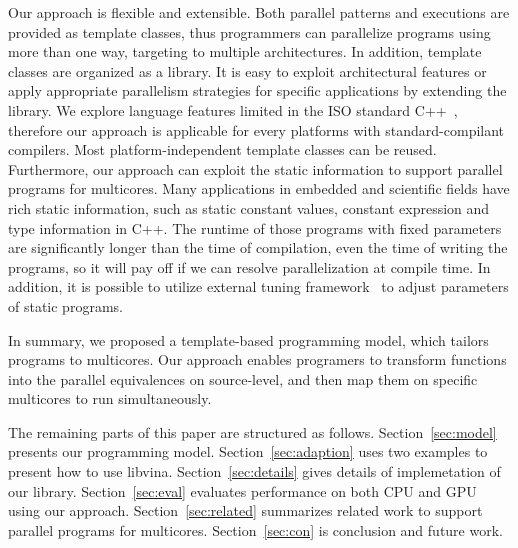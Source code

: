 Our approach is flexible and extensible. Both parallel patterns and
executions are provided as template classes, thus programmers can
parallelize programs using more than one way, targeting to multiple architectures. In addition, template
classes are organized as a library. It is
easy to exploit architectural
features or apply appropriate parallelism strategies for specific applications
by extending the library. We
explore language features limited in the ISO
standard C++~\cite{c++98, c++03, c++0x}, therefore our approach is
applicable for every platforms with standard-compilant compilers. Most 
platform-independent template classes can be reused. 
Furthermore, our approach can exploit the static information to
support parallel programs for multicores.
Many applications in embedded and scientific fields have rich
static information, such as static constant values, constant
expression and type information in C++. The runtime of those programs
with fixed parameters are significantly longer than the time of
compilation,  even
the time of writing the programs, so it will pay off if we can resolve
parallelization at compile time. In
addition, it is possible to utilize external
tuning framework~\cite{tuningfrm} to adjust parameters of static programs.

In summary, we proposed a template-based programming model, which 
tailors programs to multicores. Our approach enables programers to transform functions into the parallel
equivalences on source-level, and then map them on specific multicores to run simultaneously.

The remaining parts of this paper are structured as follows.
Section~\ref{sec:model} presents our programming model. 
Section~\ref{sec:adaption} uses two examples to present how to use libvina. Section~\ref{sec:details} gives details of
implemetation of our library. Section~\ref{sec:eval}
evaluates performance on both CPU and GPU using our approach.
Section~\ref{sec:related} summarizes related work to support parallel programs
for multicores. Section~\ref{sec:con} is conclusion and future work.

